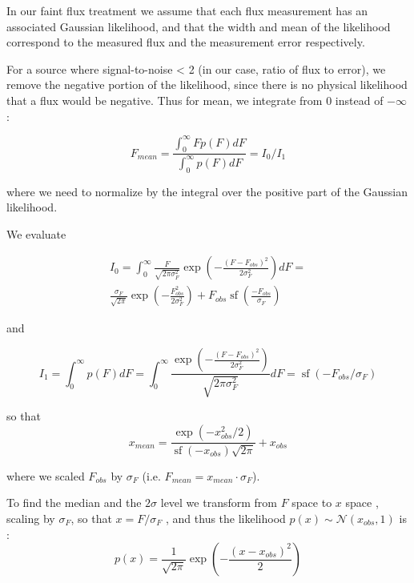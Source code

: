 \documentclass[fleqn,usenatbib]{mnras}  %
\DeclareMathOperator\sf{sf}
\begin{document}
In our faint flux treatment  we assume that each flux measurement has an associated Gaussian likelihood, and that the width and mean of the likelihood correspond 
to the measured flux and the measurement error respectively. 

For a source where signal-to-noise < 2 (in our case, ratio of  flux to error), we remove the negative portion of the likelihood, since there is no physical likelihood that a flux would be negative.
Thus for mean, we integrate from $0$ instead of $-\infty$ : 


\begin{equation}
F_{mean} = \frac{\int _{0} ^ {\infty}{F p(F) dF}}{\int _{0} ^ {\infty}{p(F) dF}} = I_{0} / I_{1}
\end{equation}

where we need to normalize by the integral over the positive part of the Gaussian likelihood. 

We evaluate 

\begin{multline}
I_{0}= \int _{0} ^ {\infty} {\frac{F}{\sqrt{2\pi\sigma_{F}^{2}}} \exp{\left(-\frac{(F-F_{obs})^{2}}{2\sigma_{F}^{2}}\right)} }dF = \\  \frac{\sigma_{F}}{\sqrt{2 \pi}} \exp{\left(- \frac{F_{obs}^{2}}{2\sigma_{F}^{2}} \right)} + F_{obs} \sf{\left( \frac{-F_{obs}}{\sigma_{F}}\right)}
\end{multline}

and 

\begin{equation}
I_{1} = \int _{0} ^ {\infty}{ p(F) dF} = \int _{0} ^ {\infty} {\frac{\exp{\left(-\frac{(F-F_{obs})^{2}}{2\sigma_{F}^{2}}\right)} }{\sqrt{2\pi\sigma_{F}^{2}}} }dF = \sf{(-F_{obs} / \sigma_{F})}
\end{equation}

so that 
\begin{equation}
x_{mean} = \frac{\exp{(- x_{obs}^{2} / 2 )} }{\sf{(-x_{obs})}\sqrt{2 \pi}} + x_{obs} 
\end{equation}

where we scaled $F_{obs}$ by  $\sigma_F$  (i.e. $F_{mean} = x_{mean} \cdot \sigma_{F}$). 



\bigskip

To find the median and the $2\sigma$ level we transform from $F$ space to $x$ space , scaling by  $\sigma_{F}$, so that $x = F / \sigma_{F}$ , and thus the likelihood $p(x) \sim \mathcal{N}(x_{obs},1)$ is :
\begin{equation}
p(x) = \frac{1}{\sqrt{2  \pi }} \exp{ \left(-\frac{(x-x_{obs})^{2}}{2}\right)}
\end{equation}
\end{document}

